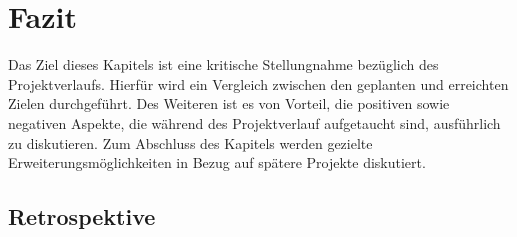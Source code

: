 \newpage
\section{Fazit}

Das Ziel dieses Kapitels ist eine kritische Stellungnahme bezüglich des Projektverlaufs. Hierfür wird ein Vergleich zwischen den geplanten und erreichten Zielen durchgeführt. Des Weiteren ist es von Vorteil, die positiven sowie negativen Aspekte, die während des Projektverlauf aufgetaucht sind, ausführlich zu diskutieren. Zum Abschluss des Kapitels werden gezielte Erweiterungsmöglichkeiten in Bezug auf spätere Projekte diskutiert.

\subsection{Retrospektive} \label{sec:Retrospektive}

